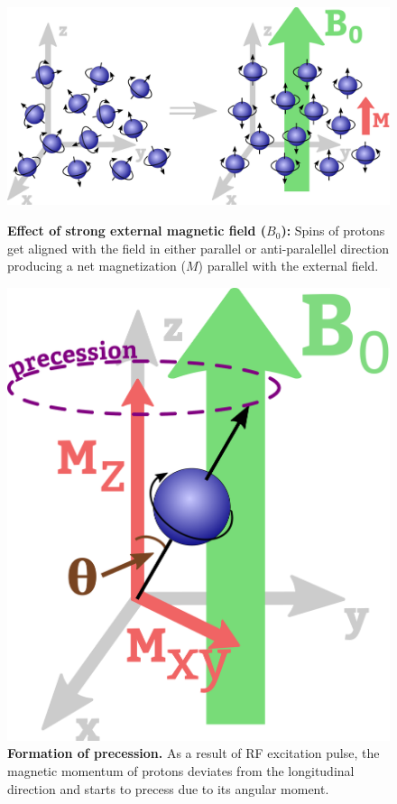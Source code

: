 \begin{figure}[thb]
    \centering
    \begin{minipage}{.52\textwidth}
        \centering
        \includegraphics[width=0.8\linewidth]{images/net_magnetization.pdf}
        \caption{\textbf{Effect of strong external magnetic field ($B_0$):} Spins of protons get aligned with the field in either parallel or anti-paralellel direction producing a net magnetization ($M$) parallel with the external field.}
        \label{fig:net_magnetization}
    \end{minipage}%
    \hspace{0.03\textwidth}
    \begin{minipage}{0.44\textwidth}
        \centering
        \includegraphics[width=0.4\linewidth]{images/precession.pdf}
        \caption{\textbf{Formation of precession.} As a result of RF excitation pulse, the magnetic momentum of protons deviates from the longitudinal direction and starts to precess due to its angular moment.}
        \label{fig:precession}
    \end{minipage}
\end{figure}


